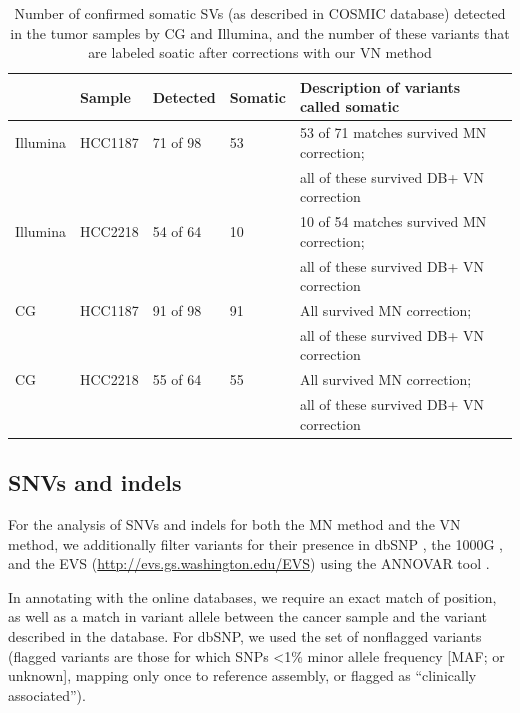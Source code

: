 \small
\begin{table}[t!]
\centering
\begin{tabular}{lllll}
          & Sample  & Detected & Somatic & Description of variants called somatic \\ \hline
Illumina  & HCC1187 & 71 of 98 & 53 & 53 of 71 matches survived MN correction; \\
          &         &          &    & all of these survived DB+ VN correction \\
Illumina  & HCC2218 & 54 of 64 & 10 & 10 of 54 matches survived MN correction;\\
          &         &          &    & all of these survived DB+ VN correction \\
CG        & HCC1187 & 91 of 98 & 91 & All survived MN correction; \\
          &         &          &    & all of these survived DB+ VN correction \\
CG        & HCC2218 & 55 of 64 & 55 & All survived MN correction; \\
          &         &          &    & all of these survived DB+ VN correction \\
\end{tabular}
\caption{Number of confirmed somatic SVs (as described in COSMIC database) detected in the tumor samples by CG and Illumina, and the number of these variants that are labeled soatic after corrections with our VN method}
\label{table:table1}
\end{table}
\normalsize

\subsection*{SNVs and indels}

For the analysis of SNVs and indels for both the MN method and the VN method, we additionally filter variants for their presence in dbSNP \cite{sherry2001dbsnp}, the 1000G \cite{10002010map,10002012integrated}, and the EVS (\url{http://evs.gs.washington.edu/EVS}) using the ANNOVAR tool \cite{wang2010annovar}.

In annotating with the online databases, we require an exact match of position, as well as a match in variant allele between the cancer sample and the variant described in the database. For dbSNP, we used the set of nonflagged variants (flagged variants are those for which SNPs <1\% minor allele frequency [MAF; or unknown], mapping only once to reference assembly, or flagged as “clinically associated”).

